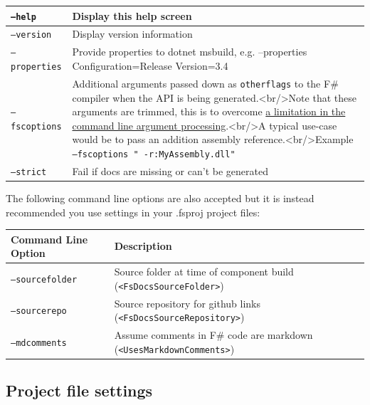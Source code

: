 \documentclass{article}
\begin{document}
\begin{tabular}{|l|l|}
\texttt{--help} & Display this help screen\\ \hline
\texttt{--version} & Display version information\\ \hline
\texttt{--properties} & Provide properties to dotnet msbuild, e.g. --properties Configuration=Release Version=3.4\\ \hline
\texttt{--fscoptions} & Additional arguments passed down as \texttt{otherflags} to the F\# compiler when the API is being generated.<br/>Note that these arguments are trimmed, this is to overcome \href{https://github.com/commandlineparser/commandline/issues/58}{a limitation in the command line argument processing}.<br/>A typical use-case would be to pass an addition assembly reference.<br/>Example \texttt{--fscoptions " -r:MyAssembly.dll"}\\ \hline
\texttt{--strict} & Fail if docs are missing or can't be generated\\ \hline
\end{tabular}



The following command line options are also accepted but it is instead recommended you use
settings in your .fsproj project files:
\begin{tabular}{|l|l|}\hline
\textbf{Command Line Option} & \textbf{Description}\\ \hline\hline
\texttt{--sourcefolder} & Source folder at time of component build (\texttt{<FsDocsSourceFolder>})\\ \hline
\texttt{--sourcerepo} & Source repository for github links (\texttt{<FsDocsSourceRepository>})\\ \hline
\texttt{--mdcomments} & Assume comments in F\# code are markdown (\texttt{<UsesMarkdownComments>})\\ \hline
\end{tabular}

\subsection*{Project file settings}
\end{document}
